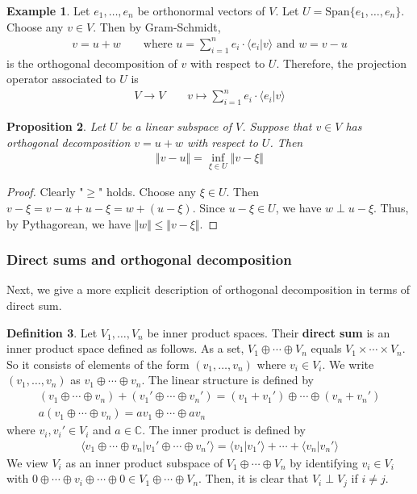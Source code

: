\documentclass[12pt,b5paper,notitlepage]{article}
\theoremstyle{definition}
\newtheorem{df}{Definition}[subsection]
\newtheorem{eg}[df]{Example}
\theoremstyle{plain}
\newtheorem{pp}[df]{Proposition}
\newcommand{\Span}{\mathrm{Span}}
\newcommand{\bk}[1]{\langle {#1}\rangle}
\newcommand{\Cbb}{\mathbb C}
\numberwithin{equation}{section}
\begin{document}
\begin{eg}\label{lb124}
Let $e_1,\dots,e_n$ be orthonormal vectors of $V$. Let $U=\Span\{e_1,\dots,e_n\}$. Choose any $v\in V$. Then by Gram-Schmidt,
\begin{align}
v=u+w\qquad\text{where }u=\sum_{i=1}^ne_i\cdot\bk{e_i|v}\text{ and }w=v-u
\end{align}
is the orthogonal decomposition of $v$ with respect to $U$. Therefore, the projection operator associated to $U$ is 
\begin{align*}
V\rightarrow V\qquad v\mapsto\sum_{i=1}^n e_i\cdot\bk{e_i|v}
\end{align*}
\end{eg}

\begin{pp}\label{lb120}
Let $U$ be a linear subspace of $V$. Suppose that $v\in V$ has orthogonal decomposition $v=u+w$ with respect to $U$. Then
\begin{align}
\Vert v-u\Vert=\inf_{\xi\in U}\Vert v-\xi\Vert
\end{align}
\end{pp}


\begin{proof}
Clearly "$\geq$" holds. Choose any $\xi\in U$. Then $v-\xi=v-u+u-\xi=w+(u-\xi)$. Since $u-\xi\in U$, we have $w\perp u-\xi$. Thus, by Pythagorean, we have $\Vert w\Vert\leq\Vert v-\xi\Vert$.
\end{proof}



\subsubsection{Direct sums and orthogonal decomposition}

Next, we give a more explicit description of orthogonal decomposition in terms of direct sum.


\begin{df}
Let $V_1,\dots,V_n$ be inner product spaces. Their \textbf{direct sum}   is an inner product space defined as follows. As a set, $V_1\oplus\cdots\oplus V_n$ equals $V_1\times\cdots\times V_n$. So it consists of elements of the form $(v_1,\dots,v_n)$ where $v_i\in V_i$. We write $(v_1,\dots,v_n)$ as $v_1\oplus\cdots\oplus v_n$. The linear structure is defined by
\begin{gather*}
(v_1\oplus\cdots\oplus v_n)+(v_1'\oplus\cdots\oplus v_n')=(v_1+v_1')\oplus\cdots\oplus (v_n+v_n')\\
a(v_1\oplus\cdots\oplus v_n)=av_1\oplus\cdots\oplus av_n
\end{gather*}
where $v_i,v_i'\in V_i$ and $a\in\Cbb$. The inner product is defined by
\begin{align*}
\bk{v_1\oplus\cdots\oplus v_n|v_1'\oplus\cdots\oplus v_n'}=\bk{v_1|v_1'}+\cdots+\bk{v_n|v_n'}
\end{align*}
We view $V_i$ as an inner product subspace of $V_1\oplus\cdots\oplus V_n$ by identifying $v_i\in V_i$ with $0\oplus\cdots\oplus v_i\oplus\cdots\oplus 0\in V_1\oplus\cdots\oplus V_n$. Then, it is clear that $V_i\perp V_j$ if $i\neq j$.
\end{df}
\end{document}
